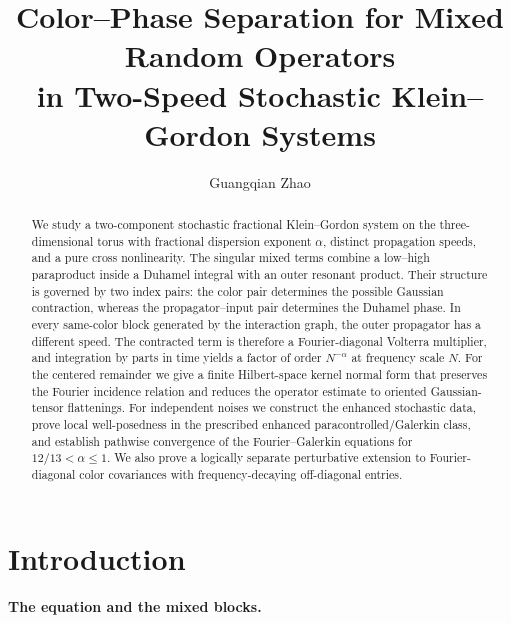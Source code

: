 \documentclass[10pt]{amsart}
\title[Color--Phase Separation for Mixed Random Operators]{Color--Phase Separation for Mixed Random Operators\\
in Two-Speed Stochastic Klein--Gordon Systems}
\author[G. Zhao]{Guangqian Zhao}
\numberwithin{equation}{section}
\theoremstyle{plain}
\theoremstyle{definition}
\theoremstyle{remark}
\begin{document}
\begin{abstract}
We study a two-component stochastic fractional Klein--Gordon system on the three-dimensional torus with fractional dispersion exponent \(\alpha\), distinct propagation speeds, and a pure cross nonlinearity.  The singular mixed terms combine a low--high paraproduct inside a Duhamel integral with an outer resonant product.  Their structure is governed by two index pairs: the color pair determines the possible Gaussian contraction, whereas the propagator--input pair determines the Duhamel phase.  In every same-color block generated by the interaction graph, the outer propagator has a different speed.  The contracted term is therefore a Fourier-diagonal Volterra multiplier, and integration by parts in time yields a factor of order \(N^{-\alpha}\) at frequency scale \(N\).  For the centered remainder we give a finite Hilbert-space kernel normal form that preserves the Fourier incidence relation and reduces the operator estimate to oriented Gaussian-tensor flattenings.  For independent noises we construct the enhanced stochastic data, prove local well-posedness in the prescribed enhanced paracontrolled/Galerkin class, and establish pathwise convergence of the Fourier--Galerkin equations for \(12/13<\alpha\le1\).  We also prove a logically separate perturbative extension to Fourier-diagonal color covariances with frequency-decaying off-diagonal entries.
\end{abstract}

\maketitle

\section{Introduction}

\paragraph{The equation and the mixed blocks.}
\end{document}
